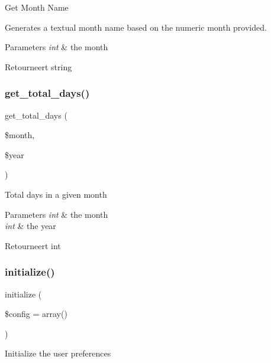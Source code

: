 Get Month Name

Generates a textual month name based on the numeric month provided.


\begin{DoxyParams}{Parameters}
{\em int} & the month \\
\hline
\end{DoxyParams}
\begin{DoxyReturn}{Retourneert}
string 
\end{DoxyReturn}
\mbox{\label{class_c_i___calendar_a3c863f62907e445af2711df11fb90ff9}} 
\subsubsection{\texorpdfstring{get\_total\_days()}{get\_total\_days()}}
{\footnotesize\ttfamily get\+\_\+total\+\_\+days (\begin{DoxyParamCaption}\item[{}]{\$month,  }\item[{}]{\$year }\end{DoxyParamCaption})}

Total days in a given month


\begin{DoxyParams}{Parameters}
{\em int} & the month \\
\hline
{\em int} & the year \\
\hline
\end{DoxyParams}
\begin{DoxyReturn}{Retourneert}
int 
\end{DoxyReturn}
\mbox{\label{class_c_i___calendar_a481385e36d920f5a5005ace05c6cd016}} 
\subsubsection{\texorpdfstring{initialize()}{initialize()}}
{\footnotesize\ttfamily initialize (\begin{DoxyParamCaption}\item[{}]{\$config = {\ttfamily array()} }\end{DoxyParamCaption})}

Initialize the user preferences

